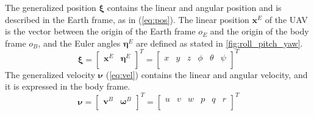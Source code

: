 \documentclass[journal]{IEEEtran}
\begin{document}
	The generalized position $\bm{\xi}$ contains the linear and angular position and is described in the Earth frame, as in (\ref{eq:pos}). The linear position $\bm{x}^E$ of the UAV is the vector between the origin of the Earth frame $o_E$ and the origin of the body frame $o_B$, and the Euler angles $\bm{\eta}^E$ are defined as stated in \figurename{\ref{fig:roll_pitch_yaw}}.
	\begin{equation} \label{eq:pos}
	\bm{\xi} = \left[ \begin{array}{cc}
	\bm{x}^E & \bm{\eta}^E \\
	\end{array}\right]^T = \left[ \begin{array}{cccccc}
	x & y & z & \phi & \theta & \psi\\
	\end{array}\right] ^T
	\end{equation}  
	The generalized velocity $\bm{\nu}$ (\ref{eq:vel}) contains the linear and angular velocity, and it is expressed in the body frame.
	\begin{equation} \label{eq:vel}
	\bm{\nu} = \left[ \begin{array}{cc}
	\bm{v}^B & \bm{\omega}^B \\
	\end{array}\right]^T = \left[ \begin{array}{cccccc}
	u & v & w & p & q & r\\
	\end{array}\right] ^T 
	\end{equation}
	
\end{document}
